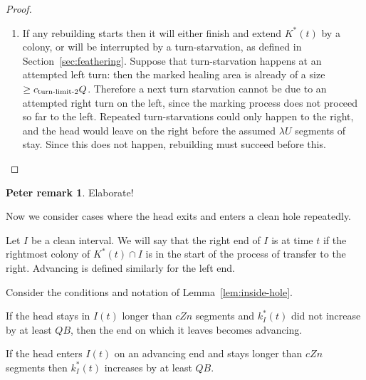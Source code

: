 \documentclass[11pt]{memoir}
\newcommand{\authnote}[3]
{\text{{ \textcolor{#3}{\( \langle\hspace{-0.2em}\langle \)\textsf{\footnotesize #1: #2}\( \rangle\hspace{-0.2em}\rangle \)}}}}
\newcommand{\authnote}[2]{}
\newcommand{\Pnote}[1]{{\authnote{P}{#1}{cyan}}}
\theoremstyle{definition} %
\newtheorem{Premark}{\color{cyan}Peter remark}
\newenvironment{premark}{\begin{Premark}\color{cyan}}{\varqed\end{Premark}}
\renewcommand{\Pnote}[1]{\begin{premark}#1\end{premark}}
\renewcommand{\ge}{\geq}
\def\B{B}
\def\U{U}
\newcommand{\Q}{Q}
\newcommand{\Z}{Z}
\newcommand{\cns}[1]{c_{\textrm{\upshape #1}}}
\begin{document}
\begin{proof}
\begin{enumerate}
\item  If any rebuilding starts then it will either finish and extend \( K^{*}(t) \) by a colony,
  or will be interrupted by a turn-starvation, as defined in Section~\ref{sec:feathering}.
  Suppose that turn-starvation happens at an attempted left turn: then the marked healing area is already
  of a size \( \ge\cns{turn-limit-2}\Q \).
  Therefore a next turn starvation cannot be due to an attempted right turn on the left, since
  the marking process does not proceed so far to the left.
  Repeated turn-starvations could only happen to the right, and the head would leave on the right before the
  assumed \( \lambda\U \) segments of stay.
  Since this does not happen, rebuilding must succeed before this.
\end{enumerate}
\end{proof}
\Pnote{Elaborate!}

Now we consider cases where the head exits and enters a clean hole repeatedly.

\begin{definition}\label{def:super-healthy-end}
  Let \( I \) be a clean interval.
  We will say that the right end of \( I \) is  at time \( t \)
  if the rightmost colony of \( K^{*}(t)\cap I \) is in the start of the process of transfer to the right.
  Advancing is defined similarly for the left end.
\end{definition}

\begin{lemma}\label{lem:advancing-end}
  Consider the conditions and notation of Lemma~\ref{lem:inside-hole}.
  \begin{alphenum}
  \item\label{i:make-advancing}
    If the head stays in \( I(t) \) longer than 
    \( c\Z n \) segments and \( k^{*}_{I}(t) \) did not increase by at least \( \Q\B \),
    then the end on which it leaves becomes advancing.
  \item\label{i:enter-advancing}
    If the head enters \( I(t) \) on an advancing end and stays longer than \( c\Z n \) segments
    then \( k^{*}_{I}(t) \) increases by at least \( \Q\B \).
  \end{alphenum}
\end{lemma}
\end{document}

